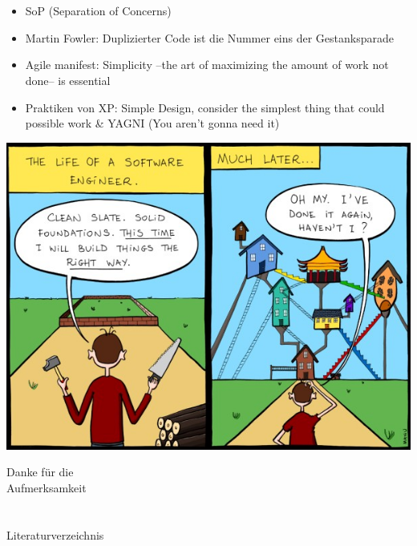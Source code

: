 \documentclass[12pt]{beamer}
\begin{document}
\section{}
\begin{frame}
	\begin{minipage}{0.5\textwidth} 
		\begin{itemize}
			\item SoP (Separation of Concerns)
			\item Martin Fowler: Duplizierter Code ist die Nummer eins der Gestanksparade
			\item Agile manifest: Simplicity --the art of maximizing the amount of work not done-- is essential
			\item Praktiken von XP: Simple Design, consider the simplest thing that could possible work \& YAGNI (You aren't gonna need it)
		\end{itemize}
	\end{minipage}
	\begin{minipage}{0.48\textwidth} 
		\vspace{1cm}
		\includegraphics[width=1\textwidth]{Images/software-eng} \\
		\vspace{-0.7cm}
		\begin{center}\Large Danke für die \\ Aufmerksamkeit \end{center}
	\end{minipage}
\end{frame}


\section{}
\begin{frame}[t,allowframebreaks]{Literaturverzeichnis}
	\printbibliography[heading=none]
\end{frame}
\end{document}
